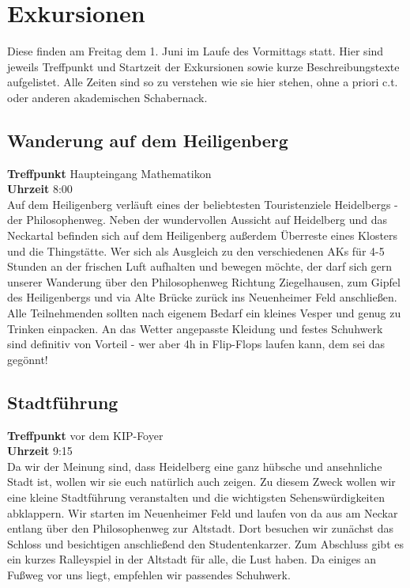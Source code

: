 
\section{Exkursionen}

Diese finden am Freitag dem 1. Juni im Laufe des Vormittags statt.
Hier sind jeweils Treffpunkt und Startzeit der Exkursionen sowie kurze Beschreibungstexte aufgelistet.
Alle Zeiten sind so zu verstehen wie sie hier stehen, ohne a priori c.t. oder anderen akademischen Schabernack.

\subsection*{Wanderung auf dem Heiligenberg}
\textbf{Treffpunkt} Haupteingang Mathematikon\\
\textbf{Uhrzeit} 8:00\\
Auf dem Heiligenberg verläuft eines der beliebtesten Touristenziele Heidelbergs - der Philosophenweg. Neben der wundervollen Aussicht auf Heidelberg und das Neckartal befinden sich auf dem Heiligenberg außerdem Überreste eines Klosters und die Thingstätte. Wer sich als Ausgleich zu den verschiedenen AKs für 4-5 Stunden an der frischen Luft aufhalten und bewegen möchte, der darf sich gern unserer Wanderung über den Philosophenweg Richtung Ziegelhausen, zum Gipfel des Heiligenbergs und via Alte Brücke zurück ins Neuenheimer Feld anschließen. Alle Teilnehmenden sollten nach eigenem Bedarf ein kleines Vesper und genug zu Trinken einpacken. An das Wetter angepasste Kleidung und festes Schuhwerk sind definitiv von Vorteil - wer aber 4h in Flip-Flops laufen kann, dem sei das gegönnt! 

\subsection*{Stadtführung}
\textbf{Treffpunkt} vor dem KIP-Foyer\\
\textbf{Uhrzeit} 9:15\\
Da wir der Meinung sind, dass Heidelberg eine ganz hübsche und ansehnliche Stadt ist, wollen wir sie euch natürlich auch zeigen. Zu diesem Zweck wollen wir eine kleine Stadtführung veranstalten und die wichtigsten Sehenswürdigkeiten abklappern. Wir starten im  Neuenheimer Feld und laufen von da aus am Neckar entlang über den Philosophenweg zur Altstadt. Dort besuchen wir zunächst das Schloss und besichtigen anschließend den Studentenkarzer. Zum Abschluss gibt es ein kurzes Ralleyspiel in der Altstadt für alle, die Lust haben. Da einiges an Fußweg vor uns liegt, empfehlen wir passendes Schuhwerk. 

